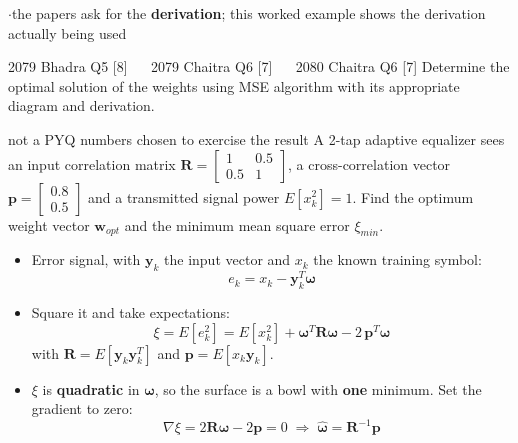{\color{sub}\footnotesize {}  \gap$\cdot$\gap the papers ask for the \textbf{derivation}; this worked
example shows the derivation actually being used}

\begin{asked}{2079 Bhadra \textperiodcentered{} Q5 \textperiodcentered{} [8]
\ \textperiodcentered{} \ 2079 Chaitra \textperiodcentered{} Q6 \textperiodcentered{} [7]
\ \textperiodcentered{} \ 2080 Chaitra \textperiodcentered{} Q6 \textperiodcentered{} [7]}
Determine the optimal solution of the weights using MSE algorithm with its appropriate diagram
and derivation.
\end{asked}
\begin{asked}[PROBLEM]{not a PYQ \textperiodcentered{} numbers chosen to exercise the result \added}
A 2-tap adaptive equalizer sees an input correlation matrix
$\mathbf{R} = \begin{bmatrix} 1 & 0.5 \\ 0.5 & 1 \end{bmatrix}$, a cross-correlation vector
$\mathbf{p} = \begin{bmatrix} 0.8 \\ 0.5 \end{bmatrix}$ and a transmitted signal power
$E[x_k^2] = 1$. Find the optimum weight vector $\mathbf{w}_{opt}$ and the minimum mean square
error $\xi_{min}$.
\end{asked}

\begin{itemize}
  \item Error signal, with $\mathbf{y}_k$ the input vector and $x_k$ the known training symbol:
        \[ e_k = x_k - \mathbf{y}_k^T\boldsymbol{\omega} \]
  \item Square it and take expectations:
        \[ \xi = E[e_k^2]
               = E[x_k^2] + \boldsymbol{\omega}^T \mathbf{R} \boldsymbol{\omega}
                 - 2\,\mathbf{p}^T\boldsymbol{\omega} \]
        with $\mathbf{R} = E[\mathbf{y}_k\mathbf{y}_k^T]$ and
        $\mathbf{p} = E[x_k\mathbf{y}_k]$.
  \item $\xi$ is \textbf{quadratic} in $\boldsymbol{\omega}$, so the surface is a bowl with
        \textbf{one} minimum. Set the gradient to zero:
        \[ \nabla\xi = 2\mathbf{R}\boldsymbol{\omega} - 2\mathbf{p} = 0
           \;\Longrightarrow\;
           \boxed{\hat{\boldsymbol{\omega}} = \mathbf{R}^{-1}\mathbf{p}} \]
\end{itemize}

